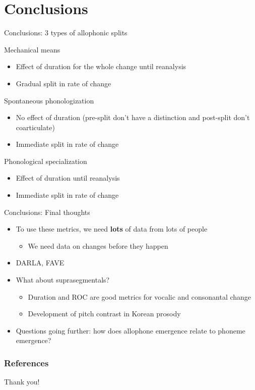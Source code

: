 \documentclass[hyperref={pdfpagelabels=false}]{beamer}
\begin{document}
\section{Conclusions}

\begin{frame}{Conclusions: 3 types of allophonic splits}
	\begin{block}{Mechanical means}
		\begin{itemize}
			\item Effect of duration for the whole change until reanalysis
			\item Gradual split in rate of change \pause
		\end{itemize}
	\end{block}
	
	\begin{block}{Spontaneous phonologization}
		\begin{itemize}
			\item No effect of duration (pre-split don't have a distinction and post-split don't coarticulate)
			\item Immediate split in rate of change \pause
		\end{itemize}
	\end{block}
	
	\begin{block}{Phonological specialization}
		\begin{itemize}
			\item Effect of duration until reanalysis
			\item Immediate split in rate of change 
		\end{itemize}
	\end{block}
\end{frame}

\begin{frame}{Conclusions: Final thoughts}
	\begin{itemize}
		\item To use these metrics, we need \textbf{lots} of data from lots of people \pause
			\begin{itemize}
			\item We need data on changes before they happen \pause
			\end{itemize}
		\item DARLA, FAVE \pause
		\item What about suprasegmentals?
			\begin{itemize}
			\item Duration and ROC are good metrics for vocalic and consonantal change \pause
			\item \cite{Cho2015} Development of pitch contrast in Korean prosody \pause 
			\end{itemize}		
		\item Questions going further: how does allophone emergence relate to phoneme emergence?
	\end{itemize}
\end{frame}

\begin{frame}[allowframebreaks]
\frametitle{References}



\end{frame}

\begin{frame}
\begin{center}
\huge{Thank you!}
\end{center}
\end{frame}
\end{document}
